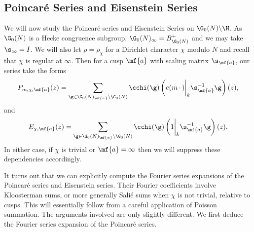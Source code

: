 \documentclass[12pt]{article}
\begin{document}
    \subsection{Poincar\'e Series and Eisenstein Series}
      We will now study the Poincar\'e series and Eisenstein Series on \(\G_{0}(N)\backslash\H\). As \(\G_{0}(N)\) is a Hecke congruence subgroup, \(\G_{0}(N)_{\infty} = B_{\G_{0}(N)}^{+}\) and we may take \(\s_{\infty} = I\). We will also let \(\rho = \rho_{\chi}\) for a Dirichlet character \(\chi\) modulo \(N\) and recall that \(\chi\) is regular at \(\infty\). Then for a cusp \(\mf{a}\) with scaling matrix \(\s_{\mf{a}}\), our series take the forms
      \[
        P_{m,\chi,\mf{a}}(z) = \sum_{\g \in \G_{0}(N)_{\mf{a}}\backslash\G_{0}(N)}\cchi(\g)\left(e(m\,\cdot\,)\bigg|_{k}\s_{\mf{a}}^{-1}\g\right)(z),
      \]
      and
      \[
        E_{\chi,\mf{a}}(z) = \sum_{\g \in \G_{0}(N)_{\mf{a}}\backslash\G_{0}(N)}\cchi(\g)\left(1\bigg|_{k}\s_{\mf{a}}^{-1}\g\right)(z).
      \]
      In either case, if \(\chi\) is trivial or \(\mf{a} = \infty\) then we will suppress these dependencies accordingly.
      
      It turns out that we can explicitly compute the Fourier series expansions of the Poincar\'e series and Eisenstein series. Their Fourier coefficients involve Kloosterman sums, or more generally Sali\'e sums when \(\chi\) is not trivial, relative to cusps. This will essentially follow from a careful application of Poisson summation. The arguments involved are only slightly different. We first deduce the Fourier series expansion of the Poincar\'e series.
\end{document}
